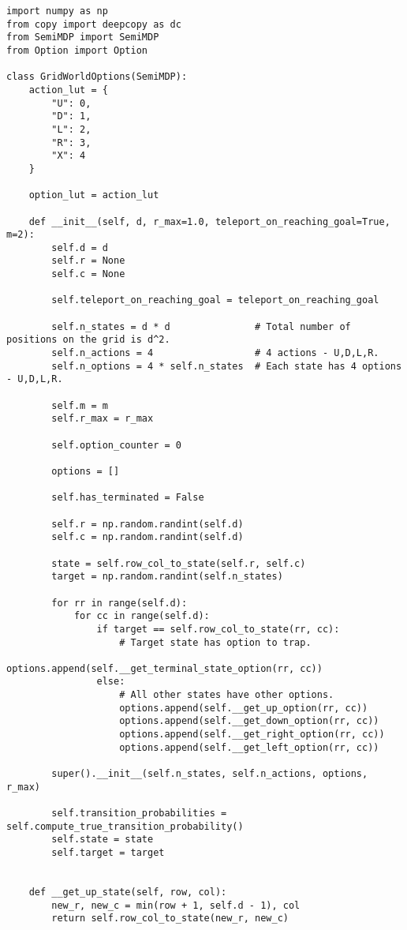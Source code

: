 \begin{verbatim}
import numpy as np
from copy import deepcopy as dc
from SemiMDP import SemiMDP
from Option import Option

class GridWorldOptions(SemiMDP):
    action_lut = {
        "U": 0,
        "D": 1,
        "L": 2,
        "R": 3,
        "X": 4
    }

    option_lut = action_lut

    def __init__(self, d, r_max=1.0, teleport_on_reaching_goal=True, m=2):
        self.d = d
        self.r = None
        self.c = None

        self.teleport_on_reaching_goal = teleport_on_reaching_goal

        self.n_states = d * d               # Total number of positions on the grid is d^2.
        self.n_actions = 4                  # 4 actions - U,D,L,R.
        self.n_options = 4 * self.n_states  # Each state has 4 options - U,D,L,R.

        self.m = m
        self.r_max = r_max

        self.option_counter = 0

        options = []

        self.has_terminated = False

        self.r = np.random.randint(self.d)
        self.c = np.random.randint(self.d)

        state = self.row_col_to_state(self.r, self.c)
        target = np.random.randint(self.n_states)

        for rr in range(self.d):
            for cc in range(self.d):
                if target == self.row_col_to_state(rr, cc):
                    # Target state has option to trap.
                    options.append(self.__get_terminal_state_option(rr, cc))
                else:
                    # All other states have other options.
                    options.append(self.__get_up_option(rr, cc))
                    options.append(self.__get_down_option(rr, cc))
                    options.append(self.__get_right_option(rr, cc))
                    options.append(self.__get_left_option(rr, cc))

        super().__init__(self.n_states, self.n_actions, options, r_max)

        self.transition_probabilities = self.compute_true_transition_probability()
        self.state = state
        self.target = target


    def __get_up_state(self, row, col):
        new_r, new_c = min(row + 1, self.d - 1), col
        return self.row_col_to_state(new_r, new_c)


\end{verbatim}
